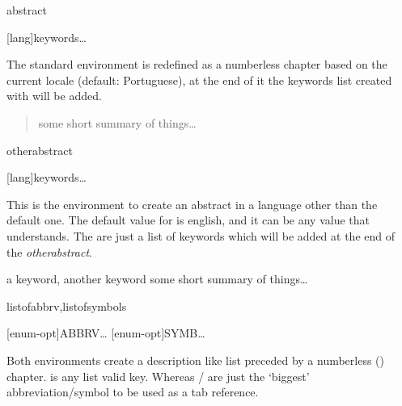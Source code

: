 \documentclass[dctools,english]{ufrgscca} %
\begin{document}
\begin{Envs}{abstract}
	\begin{Syntax}%
		\Macro{\begin{abstract}}[lang]{keywords}\ldots\Macro{\end{abstract}}{}
	\end{Syntax}
	The standard environment  is redefined as a numberless chapter based on the current locale (default: Portuguese), at the end of it the keywords list created with \Macro{\keyword}{} will be added.
\end{Envs}

\begin{stcode}[st=d.abstract]
	\keyword{a keyword}
	\keyword{another keyword}
	\begin{abstract} some short summary of things\ldots
	\end{abstract}
\end{stcode}

\begin{Envs}{otherabstract}
	\begin{Syntax}%
		\Macro{\begin{otherabstract}}[lang]{keywords}\ldots\Macro{\end{otherabstract}}{}
	\end{Syntax}
This is the environment to create an abstract in a language other than the default one.
The default value for  is english, and it can be any value that  understands. The  are just a list of keywords which will be added at the end of the \emph{otherabstract}.
\end{Envs}

\begin{stcode}[st=d.oabstract]
	\begin{otherabstract}[english]{a keyword, another keyword} some short summary of things\ldots
	\end{otherabstract}
\end{stcode}


\begin{Envs}{listofabbrv,listofsymbols}
	\begin{Syntax}%
	\Macro{\begin{listofabbrv}}[enum-opt]{ABBRV}\ldots\Macro{\end{listofabbrv}}{}
	\Macro{\begin{listofsymbols}}[enum-opt]{SYMB}\ldots\Macro{\end{listofsymbols}}{}
	\end{Syntax}
\end{Envs}
Both environments create a description like list preceded by a numberless (\Macro{\nonum}{}) chapter.  is any  list valid key. Whereas  /  are just the `biggest' abbreviation/symbol to be used as a tab reference.
\end{document}
